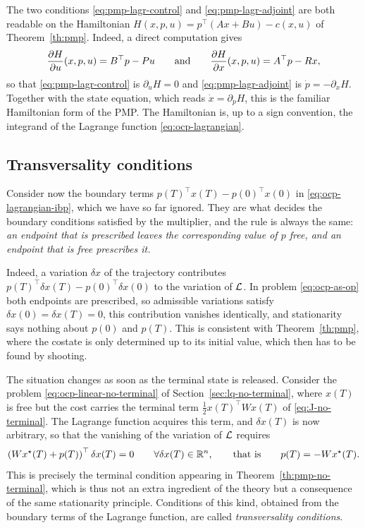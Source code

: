 \begin{remark}
    The two conditions \eqref{eq:pmp-lagr-control} and \eqref{eq:pmp-lagr-adjoint} are both readable on the Hamiltonian $H(x,p,u)=p^\top(Ax+Bu)-c(x,u)$ of Theorem~\ref{th:pmp}. Indeed, a direct computation gives
    \begin{equation}
        \frac{\partial H}{\partial u}(x,p,u) = B^\top p - Pu
        \qquad\text{and}\qquad
        \frac{\partial H}{\partial x}(x,p,u) = A^\top p - Rx,
    \end{equation}
    so that \eqref{eq:pmp-lagr-control} is $\partial_u H = 0$ and \eqref{eq:pmp-lagr-adjoint} is $\dot p = -\partial_x H$. Together with the state equation, which reads $\dot x = \partial_p H$, this is the familiar Hamiltonian form of the PMP. The Hamiltonian is, up to a sign convention, the integrand of the Lagrange function \eqref{eq:ocp-lagrangian}.
\end{remark}

\subsection{Transversality conditions}

Consider now the boundary terms $p(T)^\top x(T) - p(0)^\top x(0)$ in \eqref{eq:ocp-lagrangian-ibp}, which we have so far ignored. They are what decides the boundary conditions satisfied by the multiplier, and the rule is always the same: \emph{an endpoint that is prescribed leaves the corresponding value of $p$ free, and an endpoint that is free prescribes it.}

Indeed, a variation $\delta x$ of the trajectory contributes $p(T)^\top \delta x(T) - p(0)^\top \delta x(0)$ to the variation of $\mathcal{L}$. In problem \eqref{eq:ocp-as-op} both endpoints are prescribed, so admissible variations satisfy $\delta x(0)=\delta x(T)=0$, this contribution vanishes identically, and stationarity says nothing about $p(0)$ and $p(T)$. This is consistent with Theorem~\ref{th:pmp}, where the costate is only determined up to its initial value, which then has to be found by shooting.

The situation changes as soon as the terminal state is released. Consider the problem \eqref{eq:ocp-linear-no-terminal} of Section~\ref{sec:lq-no-terminal}, where $x(T)$ is free but the cost carries the terminal term $\frac12 x(T)^\top W x(T)$ of \eqref{eq:J-no-terminal}. The Lagrange function acquires this term, and $\delta x(T)$ is now arbitrary, so that the vanishing of the variation of $\mathcal{L}$ requires
\begin{equation}
    \left( W x^\star(T) + p(T) \right)^\top \delta x(T) = 0
    \qquad \forall \delta x(T)\in\mathbb{R}^n,
    \qquad\text{that is}\qquad
    p(T) = -W x^\star(T).
\end{equation}
This is precisely the terminal condition appearing in Theorem~\ref{th:pmp-no-terminal}, which is thus not an extra ingredient of the theory but a consequence of the same stationarity principle. Conditions of this kind, obtained from the boundary terms of the Lagrange function, are called \emph{transversality conditions}.

